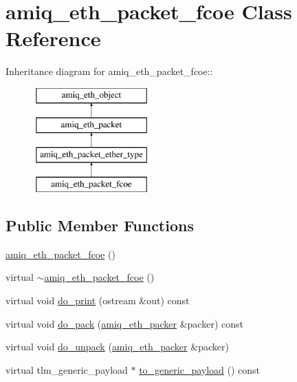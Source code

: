 \hypertarget{classamiq__eth__packet__fcoe}{
\section{amiq\_\-eth\_\-packet\_\-fcoe Class Reference}
\label{classamiq__eth__packet__fcoe}
}
Inheritance diagram for amiq\_\-eth\_\-packet\_\-fcoe::\begin{figure}[H]
\begin{center}
\leavevmode
\includegraphics[height=4cm]{classamiq__eth__packet__fcoe}
\end{center}
\end{figure}
\subsection*{Public Member Functions}
\begin{DoxyCompactItemize}
\item 
\hyperlink{classamiq__eth__packet__fcoe_a8f9a82423c47abe1533b65751bc75e19}{amiq\_\-eth\_\-packet\_\-fcoe} ()
\item 
virtual \hyperlink{classamiq__eth__packet__fcoe_a44032a18eefcad771294b141167dcf14}{$\sim$amiq\_\-eth\_\-packet\_\-fcoe} ()
\item 
virtual void \hyperlink{classamiq__eth__packet__fcoe_a39fa215f83aa71ff06c5fd699de8e427}{do\_\-print} (ostream \&out) const 
\item 
virtual void \hyperlink{classamiq__eth__packet__fcoe_ae119ce0a219ea22eef14da61262afbb7}{do\_\-pack} (\hyperlink{classamiq__eth__packer}{amiq\_\-eth\_\-packer} \&packer) const 
\item 
virtual void \hyperlink{classamiq__eth__packet__fcoe_afb550561999badc5693283b852be2f70}{do\_\-unpack} (\hyperlink{classamiq__eth__packer}{amiq\_\-eth\_\-packer} \&packer)
\item 
virtual tlm\_\-generic\_\-payload $\ast$ \hyperlink{classamiq__eth__packet__fcoe_aa341b2f7df8abf278713e98015565c9f}{to\_\-generic\_\-payload} () const 
\end{DoxyCompactItemize}
